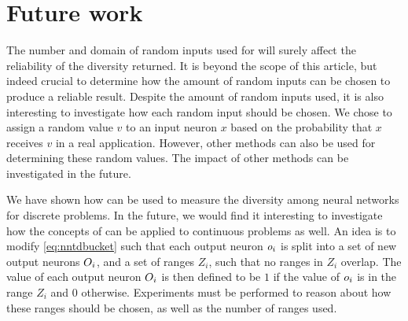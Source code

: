 \section{Future work}\label{sec:futurework}
The number and domain of random inputs used for \dia{} will surely affect the reliability of the diversity returned. It is beyond the scope of this article, but indeed crucial to determine how the amount of random inputs can be chosen to produce a reliable result.
Despite the amount of random inputs used, it is also interesting to investigate how each random input should be chosen. We chose to assign a random value $v$ to an input neuron $x$ based on the probability that $x$ receives $v$ in a real application. However, other methods can also be used for determining these random values. The impact of other methods can be investigated in the future. 

We have shown how \dia{} can be used to measure the diversity among neural networks for discrete problems. In the future, we would find it interesting to investigate how the concepts of \dia{} can be applied to continuous problems as well. An idea is to modify \cref{eq:nntdbucket} such that each output neuron $o_i$ is split into a set of new output neurons $O_i$, and a set of ranges $Z_i$, such that no ranges in $Z_i$ overlap. The value of each output neuron $O_i$ is then defined to be $1$ if the value of $o_i$ is in the range $Z_i$ and 0 otherwise. Experiments must be performed to reason about how these ranges should be chosen, as well as the number of ranges used.
